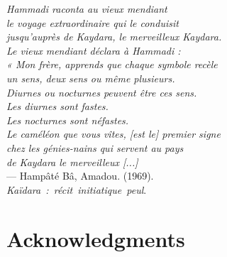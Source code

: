 
\begin{flushright}{\slshape
    Hammadi raconta au vieux mendiant \\
    le voyage extraordinaire qui le conduisit \\
    jusqu'auprès de Kaydara, le merveilleux Kaydara. \\
    Le vieux mendiant déclara à Hammadi : \\
    « Mon frère, apprends que chaque symbole recèle \\
    un sens, deux sens ou même plusieurs. \\
    Diurnes ou nocturnes peuvent être ces sens. \\
    Les diurnes sont fastes. \\
    Les nocturnes sont néfastes.\\
    Le caméléon que vous vîtes, [est le] premier signe \\
    chez les génies-nains qui servent au pays \\
    de Kaydara le merveilleux [...]} \\ 
    \medskip
    --- Hampâté Bâ, Amadou. (1969). \\
    \mbox{\textit{Kaïdara : récit initiatique peul}.}
\end{flushright}

\bigskip

\begingroup
\let\clearpage\relax
\let\cleardoublepage\relax
\let\cleardoublepage\relax
\chapter*{Acknowledgments}
\bigskip


\endgroup
